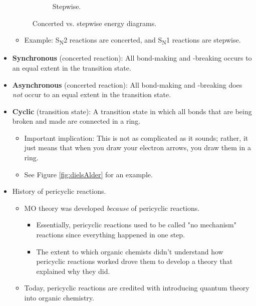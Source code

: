 \documentclass[../notes.tex]{subfiles}
\begin{document}
\begin{itemize}
\begin{figure}[h!]
\begin{subfigure}[b]{0.25\linewidth}
            \caption{Stepwise.}
            \label{fig:concertedStepwiseNrgb}
        \end{subfigure}
        \caption{Concerted vs. stepwise energy diagrams.}
        \label{fig:concertedStepwiseNrg}
    \end{figure}
    \begin{itemize}
        \item Example: S\textsubscript{N}2 reactions are concerted, and S\textsubscript{N}1 reactions are stepwise.
    \end{itemize}
    \item \textbf{Synchronous} (concerted reaction): All bond-making and -breaking occurs to an equal extent in the transition state.
    \item \textbf{Asynchronous} (concerted reaction): All bond-making and -breaking does \emph{not} occur to an equal extent in the transition state.
    \item \textbf{Cyclic} (transition state): A transition state in which all bonds that are being broken and made are connected in a ring.
    \begin{itemize}
        \item Important implication: This is not as complicated as it sounds; rather, it just means that when you draw your electron arrows, you draw them in a ring.
        \item See Figure \ref{fig:dielsAlder} for an example.
    \end{itemize}
    \pagebreak
    \item History of pericyclic reactions.
    \begin{itemize}
        \item MO theory was developed \emph{because} of pericyclic reactions.
        \begin{itemize}
            \item Essentially, pericyclic reactions used to be called "no mechanism" reactions since everything happened in one step.
            \item The extent to which organic chemists didn't understand how pericyclic reactions worked drove them to develop a theory that explained why they did.
        \end{itemize}
        \item Today, pericyclic reactions are credited with introducing quantum theory into organic chemistry.

\end{itemize}
\end{itemize}
\end{document}
